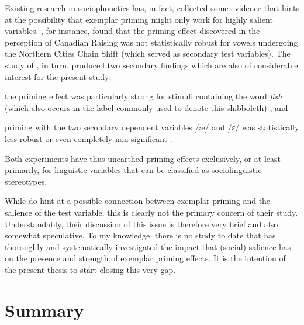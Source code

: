 Existing research in sociophonetics has, in fact, collected some evidence that hints at the possibility that exemplar priming might only work for highly salient variables.
\textcite[cf.][69--75]{niedzielski1999}, for instance, found that the priming effect discovered in the perception of Canadian Raising was not statistically robust for vowels undergoing the Northern Cities Chain Shift (which served as secondary test variables).
The \citeyear{hayetal2006a} study of \citeauthor{hayetal2006a}, in turn, produced two secondary findings which are also of considerable interest for the present study:
\begin{inparaenum}[(1)]
	\item the priming effect was particularly strong for stimuli containing the word \emph{fish} (which also occurs in the label commonly used to denote this shibboleth) \parencite[cf.][363]{hayetal2006a}, and
	\item priming with the two secondary dependent variables /æ/ and /ɛ/ was statistically less robust or even completely non-significant \parencite[cf.][367]{hayetal2006a}.
\end{inparaenum}
Both experiments have thus unearthed priming effects exclusively, or at least primarily, for linguistic variables that can be classified as sociolinguistic stereotypes.

While \textcite{hayetal2006a} do hint at a possible connection between exemplar priming and the salience of the test variable, this is clearly not the primary concern of their study.
Understandably, their discussion of this issue is therefore very brief and also somewhat speculative.
To my knowledge, there is no study to date that has thoroughly and systematically investigated the impact that (social) salience has on the presence and strength of exemplar priming effects.
It is the intention of the present thesis to start closing this very gap.

\section{Summary}

